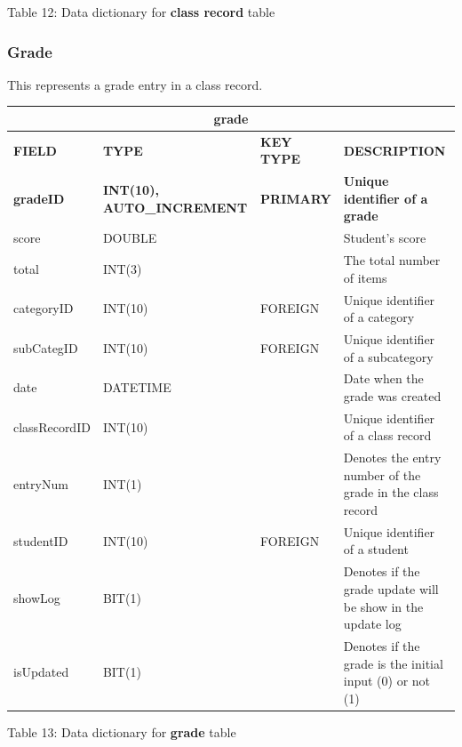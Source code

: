 \documentclass[11pt,a4paper,titlepage]{article}
\begin{document}
\vspace{.5cm}
\begin{center}
    Table 12: Data dictionary for \textbf{class record} table
\end{center}


\subsubsection{Grade}

This represents a grade entry in a class record.

\vspace{1cm}
\begin{longtable}{ |p{2.5cm}|p{4.5cm}|p{2.5cm}|p{3cm}|  }
    \hline
    \multicolumn{4}{|c|}{\textbf{grade}} \\
    \hline
    \textbf{FIELD}&\textbf{TYPE}&\textbf{KEY TYPE}&\textbf{DESCRIPTION}\\
    \hline
    \textbf{gradeID}  & \textbf{INT(10), AUTO\_INCREMENT} & \textbf{PRIMARY} & \textbf{Unique identifier of a grade}\\ \hline
    score   & DOUBLE   & & Student's score \\ \hline
    total   & INT(3)   & & The total number of items \\ \hline
    categoryID   & INT(10)   & FOREIGN & Unique identifier of a category \\ \hline
    subCategID   & INT(10)   & FOREIGN & Unique identifier of a subcategory \\ \hline
    date   & DATETIME   & & Date when the grade was created \\ \hline
    classRecordID   & INT(10)   & & Unique identifier of a class record \\ \hline
    entryNum   & INT(1)   & & Denotes the entry number of the grade in the class record \\ \hline
    studentID   & INT(10)   & FOREIGN & Unique identifier of a student \\ \hline
    showLog & BIT(1) & &  Denotes if the grade update will be show in the update log \\ \hline
    isUpdated & BIT(1) & & Denotes if the grade is the initial input (0) or not (1) \\ \hline
\end{longtable}
    
\vspace{.5cm}
\begin{center}
    Table 13: Data dictionary for \textbf{grade} table
\end{center}
\end{document}
